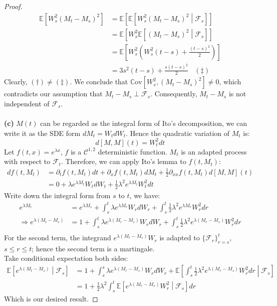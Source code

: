\documentclass[a4paper, 10pt]{article}
\theoremstyle{definition}
\theoremstyle{hSol}
\begin{document}
\begin{proof}
\begin{equation}
\begin{split}
		\mathbb{E}\left[W_s^2 (M_t-M_s)^2\right] &= \mathbb{E}\left[\mathbb{E}\left[W_s^2 (M_t-M_s)^2\middle|\mathcal{F}_s\right]\right]\\
		&=\mathbb{E}\left[W_s^2\mathbb{E}\left[ (M_t-M_s)^2\middle|\mathcal{F}_s\right]\right]\\
		&=\mathbb{E}\left[W_s^2\left(W_s^2(t-s) + \frac{(t-s)^2}{2}\right)\right]\\
		&= 3s^2(t-s) + \frac{s(t-s)^2}{2}~~~~(\ddag)
	\end{split}
\end{equation}
Clearly, $(\dag) \ne (\ddag)$. We conclude that $\mathrm{\mathbb{C}ov}\left[W_s^2, (M_t-M_s)^2\right] \ne 0$, which contradicts our assumption that $M_t-M_s \perp \mathcal{F}_s$. Consequently, $M_t-M_s$ is not independent of $\mathcal{F}_s$. \\
~\\
\textbf{(c)} $M(t)$ can be regarded as the integral form of Ito's decomposition, we can write it as the SDE form $dM_t = W_t dW_t$. Hence the quadratic variation of $M_t$ is:
$$
d[M, M](t) = W_t^2 dt
$$
Let $f(t,x)=e^{\lambda x}$, $f$ is a $\mathcal{C}^{1,2}$ deterministic function. $M_t$ is an adapted process with respect to $\mathcal{F}_t$. Therefore, we can apply Ito's lemma to $f(t,M_t)$:
\begin{equation}
	\begin{split}
		df(t,M_t) &= \partial_t f(t,M_t)dt+\partial_x f(t,M_t)dM_t+\frac{1}{2}\partial_{xx} f(t,M_t)d[M,M](t)\\
		&= 0+ \lambda e^{\lambda M_t} W_t dW_t + \frac{1}{2}\lambda^2 e^{\lambda M_t} W_t^2 dt
	\end{split}
\end{equation}
Write down the integral form from $s$ to $t$, we have:
\begin{equation}
	\begin{split}
		e^{\lambda M_t} &= e^{\lambda M_s} + \int_s^t\lambda e^{\lambda M_r} W_r dW_r + \int_s^t \frac{1}{2}\lambda^2 e^{\lambda M_r} W_r^2 dr\\
		\Rightarrow e^{\lambda (M_t-M_s)} &= 1 + \int_s^t\lambda e^{\lambda (M_r-M_s)} W_r dW_r + \int_s^t \frac{1}{2}\lambda^2 e^{\lambda (M_r-M_s)} W_r^2 dr\\
	\end{split}
\end{equation}
For the second term, the integrand $e^{\lambda (M_r-M_s)} W_r$ is adapted to $\{\mathcal{F}_r\}_{r=s}^t$, $s\leq r \leq t$; hence the second term is a martingale. \\
Take conditional expectation both sides:
\begin{equation}
	\begin{split}
		\mathbb{E}\left[e^{\lambda (M_t-M_s)}\middle|\mathcal{F}_s\right] &= 1 + \int_s^s\lambda e^{\lambda (M_r-M_s)} W_r dW_r + \mathbb{E}\left[\int_s^t \frac{1}{2}\lambda^2 e^{\lambda (M_r-M_s)} W_r^2 dr\middle|\mathcal{F}_s\right] \\
		&=1  + \frac{1}{2}\lambda^2\int_s^t  \mathbb{E}\left[e^{\lambda (M_r-M_s)} W_r^2\middle|\mathcal{F}_s\right] dr 
	\end{split}
\end{equation}
Which is our desired result.



\end{proof}
\end{document}
